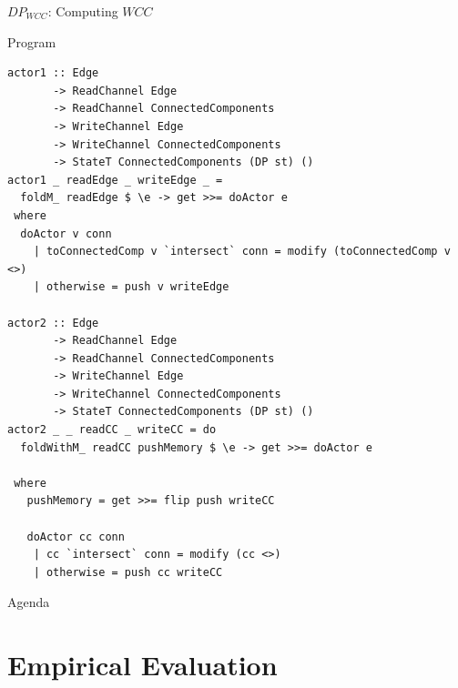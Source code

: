 \documentclass{beamer}
\begin{document}
  \begin{frame}[fragile]{$DP_{WCC}$: Computing $WCC$}
    \begin{block}{Program}
      \begin{verbatim}      
actor1 :: Edge
       -> ReadChannel Edge
       -> ReadChannel ConnectedComponents
       -> WriteChannel Edge
       -> WriteChannel ConnectedComponents
       -> StateT ConnectedComponents (DP st) ()
actor1 _ readEdge _ writeEdge _ = 
  foldM_ readEdge $ \e -> get >>= doActor e
 where
  doActor v conn
    | toConnectedComp v `intersect` conn = modify (toConnectedComp v <>)
    | otherwise = push v writeEdge

actor2 :: Edge
       -> ReadChannel Edge
       -> ReadChannel ConnectedComponents
       -> WriteChannel Edge
       -> WriteChannel ConnectedComponents
       -> StateT ConnectedComponents (DP st) ()
actor2 _ _ readCC _ writeCC = do 
  foldWithM_ readCC pushMemory $ \e -> get >>= doActor e

 where
   pushMemory = get >>= flip push writeCC

   doActor cc conn
    | cc `intersect` conn = modify (cc <>)
    | otherwise = push cc writeCC
      \end{verbatim}
    \end{block}
  \end{frame}

  \begin{frame}{Agenda}
    \section{Empirical Evaluation}
    \tableofcontents[currentsection]
  \end{frame}
\end{document}
